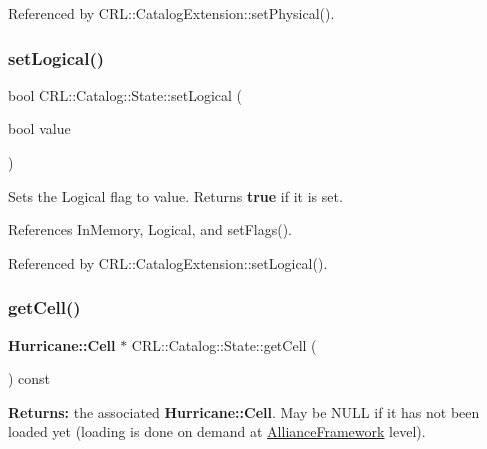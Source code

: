 Referenced by C\+R\+L\+::\+Catalog\+Extension\+::set\+Physical().

\mbox{\label{classCRL_1_1Catalog_1_1State_af41327abeb4e7646ef5cafabe8eeabd0}} 
\subsubsection{\texorpdfstring{set\+Logical()}{setLogical()}}
{\footnotesize\ttfamily bool C\+R\+L\+::\+Catalog\+::\+State\+::set\+Logical (\begin{DoxyParamCaption}\item[{bool}]{value }\end{DoxyParamCaption})\hspace{0.3cm}{\ttfamily [inline]}}

Sets the Logical flag to {\ttfamily value}. Returns {\bfseries true} if it is set. 

References In\+Memory, Logical, and set\+Flags().



Referenced by C\+R\+L\+::\+Catalog\+Extension\+::set\+Logical().

\mbox{\label{classCRL_1_1Catalog_1_1State_a0cc5ef54176f8207ef4e723eed62c35e}} 
\subsubsection{\texorpdfstring{get\+Cell()}{getCell()}}
{\footnotesize\ttfamily \textbf{ Hurricane\+::\+Cell} $\ast$ C\+R\+L\+::\+Catalog\+::\+State\+::get\+Cell (\begin{DoxyParamCaption}{ }\end{DoxyParamCaption}) const\hspace{0.3cm}{\ttfamily [inline]}}

{\bfseries Returns\+:} the associated \textbf{ Hurricane\+::\+Cell}. May be N\+U\+LL if it has not been loaded yet (loading is done on demand at \hyperlink{classCRL_1_1AllianceFramework}{Alliance\+Framework} level). \mbox{\label{classCRL_1_1Catalog_1_1State_a89dad78f1829b1ee3177f61e2f73d6c6}} 
